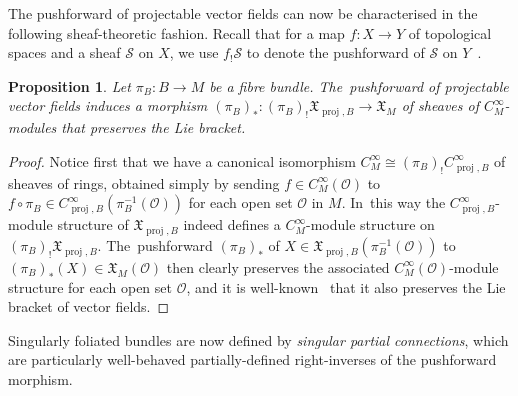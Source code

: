 \documentclass[pdftex]{sigma}
\numberwithin{equation}{section}
\newtheorem{Proposition}[Theorem]{Proposition}
\def\proj{\operatorname{proj}}
\def\OO{{\mathcal{O}}}
\def\SS{{\mathscr{S}}}
\def\XF{{\mathfrak{X}}}
\begin{document}
The pushforward of projectable vector fields can now be characterised in the following sheaf-theoretic fashion. Recall that for a map $f\colon X\rightarrow Y$ of topological spaces and a sheaf $\SS$ on $X$, we use $f_{!}\SS$ to denote the pushforward of $\SS$ on $Y$~\cite[p.~65]{hartshorne}.

\begin{Proposition}
Let $\pi_{B}\colon B\rightarrow M$ be a fibre bundle. The~pushforward of projectable vector fields induces a morphism $(\pi_{B})_{*}\colon (\pi_{B})_{!}\XF_{\proj,B}\rightarrow\XF_{M}$ of sheaves of $C^{\infty}_{M}$-modules that preserves the Lie bracket.
\end{Proposition}

\begin{proof}
Notice first that we have a canonical isomorphism $C^{\infty}_{M}\cong (\pi_{B})_{!}C^{\infty}_{\proj,B}$ of sheaves of rings, obtained simply by sending $f\in C^{\infty}_{M}(\OO)$ to $f\circ\pi_{B}\in C^{\infty}_{\proj,B}(\pi_{B}^{-1}(\OO))$ for each open set $\OO$ in $M$. In~this way the $C^{\infty}_{\proj,B}$-module structure of $\XF_{\proj,B}$ indeed defines a $C^{\infty}_{M}$-module structure on $(\pi_{B})_{!}\XF_{\proj,B}$. The~pushforward $(\pi_{B})_{*}$ of $X\in\XF_{\proj,B}(\pi_{B}^{-1}(\OO))$ to $(\pi_{B})_{*}(X)\in\XF_{M}(\OO)$ then clearly preserves the associated $C^{\infty}_{M}(\OO)$-module structure for each open set $\OO$, and it is well-known~\cite[Lemma~3.10]{natopdiffgeom} that it also preserves the Lie bracket of vector fields.
\end{proof}

Singularly foliated bundles are now defined by \textit{singular partial connections}, which are particularly well-behaved partially-defined right-inverses of the pushforward morphism.
\end{document}
